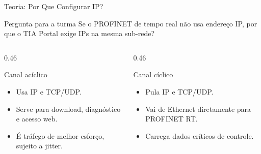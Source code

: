 \documentclass[10pt, aspectratio=169]{beamer}
\begin{document}
\begin{frame}{Teoria: Por Que Configurar IP?}
    \small
    \begin{block}{Pergunta para a turma}
        Se o PROFINET de tempo real n\~ao usa endere\c{c}o IP, por que o TIA Portal exige IPs na mesma sub-rede?
    \end{block}

    \vspace{0.25cm}
    \begin{columns}[T,totalwidth=\textwidth]
        \begin{column}{0.46\textwidth}
            \begin{block}{Canal ac\'iclico}
                \begin{itemize}
                    \item Usa IP e TCP/UDP.
                    \item Serve para download, diagn\'ostico e acesso web.
                    \item \'E tr\'afego de melhor esfor\c{c}o, sujeito a jitter.
                \end{itemize}
            \end{block}
        \end{column}
        \begin{column}{0.46\textwidth}
            \begin{block}{Canal c\'iclico}
                \begin{itemize}
                    \item Pula IP e TCP/UDP.
                    \item Vai de Ethernet diretamente para PROFINET RT.
                    \item Carrega dados cr\'iticos de controle.
                \end{itemize}
            \end{block}
        \end{column}
    \end{columns}
\end{frame}
\end{document}

